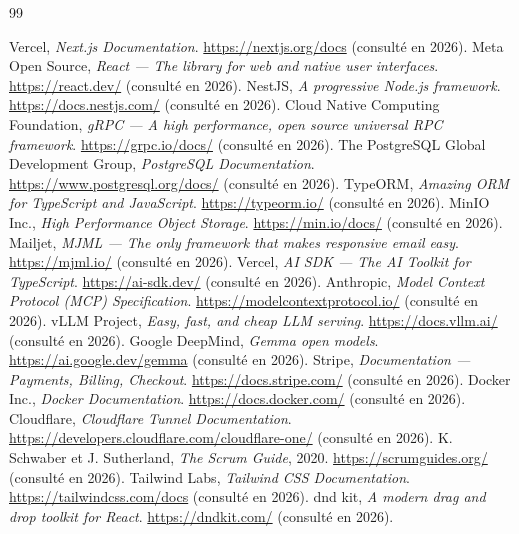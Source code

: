 \documentclass[12pt,a4paper,oneside]{report}
\begin{document}
\cleardoublepage
{}
\begin{thebibliography}{99}

 Vercel, \emph{Next.js Documentation}. \url{https://nextjs.org/docs} (consulté en 2026).
 Meta Open Source, \emph{React — The library for web and native user interfaces}. \url{https://react.dev/} (consulté en 2026).
 NestJS, \emph{A progressive Node.js framework}. \url{https://docs.nestjs.com/} (consulté en 2026).
 Cloud Native Computing Foundation, \emph{gRPC — A high performance, open source universal RPC framework}. \url{https://grpc.io/docs/} (consulté en 2026).
 The PostgreSQL Global Development Group, \emph{PostgreSQL Documentation}. \url{https://www.postgresql.org/docs/} (consulté en 2026).
 TypeORM, \emph{Amazing ORM for TypeScript and JavaScript}. \url{https://typeorm.io/} (consulté en 2026).
 MinIO Inc., \emph{High Performance Object Storage}. \url{https://min.io/docs/} (consulté en 2026).
 Mailjet, \emph{MJML — The only framework that makes responsive email easy}. \url{https://mjml.io/} (consulté en 2026).
 Vercel, \emph{AI SDK — The AI Toolkit for TypeScript}. \url{https://ai-sdk.dev/} (consulté en 2026).
 Anthropic, \emph{Model Context Protocol (MCP) Specification}. \url{https://modelcontextprotocol.io/} (consulté en 2026).
 vLLM Project, \emph{Easy, fast, and cheap LLM serving}. \url{https://docs.vllm.ai/} (consulté en 2026).
 Google DeepMind, \emph{Gemma open models}. \url{https://ai.google.dev/gemma} (consulté en 2026).
 Stripe, \emph{Documentation — Payments, Billing, Checkout}. \url{https://docs.stripe.com/} (consulté en 2026).
 Docker Inc., \emph{Docker Documentation}. \url{https://docs.docker.com/} (consulté en 2026).
 Cloudflare, \emph{Cloudflare Tunnel Documentation}. \url{https://developers.cloudflare.com/cloudflare-one/} (consulté en 2026).
 K. Schwaber et J. Sutherland, \emph{The Scrum Guide}, 2020. \url{https://scrumguides.org/} (consulté en 2026).
 Tailwind Labs, \emph{Tailwind CSS Documentation}. \url{https://tailwindcss.com/docs} (consulté en 2026).
 dnd kit, \emph{A modern drag and drop toolkit for React}. \url{https://dndkit.com/} (consulté en 2026).

\end{thebibliography}
\end{document}
